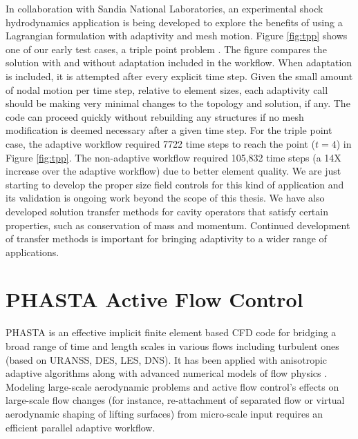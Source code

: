 In collaboration with Sandia National Laboratories, an
experimental shock hydrodynamics application is being developed
to explore the benefits of using a Lagrangian formulation with
adaptivity and mesh motion.
Figure \ref{fig:tpp} shows one of our early test cases,
a triple point problem \cite{del2011metric}.
The figure compares the solution with and without adaptation
included in the workflow.
When adaptation is included, it is attempted after every explicit
time step.
Given the small amount of nodal motion per time step, relative
to element sizes, each adaptivity call should be making very
minimal changes to the topology and solution, if any.
The code can proceed quickly without rebuilding any structures
if no mesh modification is deemed necessary after a given time step.
For the triple point case, the adaptive workflow required
7722 time steps to reach the point ($t=4$) in Figure \ref{fig:tpp}.
The non-adaptive workflow required 105,832 time steps (a 14X increase over the adaptive workflow)
due to better element quality.
We are just starting to develop the proper size field controls
for this kind of application and its validation is ongoing
work beyond the scope of this thesis.
We have also developed solution transfer methods for cavity operators
that satisfy certain properties, such as conservation of
mass and momentum.
Continued development of transfer methods is important for bringing adaptivity to
a wider range of applications.

\section{PHASTA Active Flow Control}

PHASTA \cite{JanWhi99,WhiJanDey2003} is an effective implicit finite element
based CFD code for bridging a broad range of time and length scales in various
flows including turbulent ones (based on URANSS, DES, LES, DNS). It has been
applied with anisotropic adaptive algorithms \cite{Sahn06,Sahn07,Sahn08,
ovcharenko2013parallel}
along with advanced numerical models of flow physics
\cite{HugLES99,TeJaSUPG,TeJaDFWR2}. Modeling large-scale aerodynamic problems
and active flow control's effects on large-scale flow changes (for instance,
re-attachment of separated flow or virtual aerodynamic shaping of lifting
surfaces) from micro-scale input \cite{Amitay:98,Glezer:02,Sahni:11} requires an
efficient parallel adaptive workflow.

